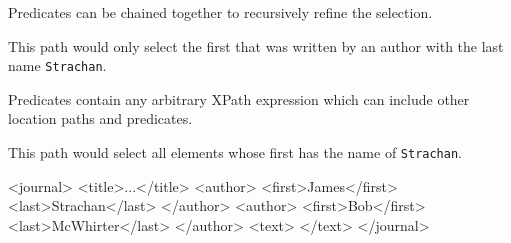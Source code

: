 \documentclass[20pt,landscape,headrule,footrule]{foils}
\begin{document}

Predicates can be chained together to recursively refine the
selection.


This path would only select the first  that was
written by an author with the last name \texttt{Strachan}.



Predicates contain any arbitrary XPath expression which can
include other location paths and predicates.


This path would select all  elements whose first
 has the  name of \texttt{Strachan}.




\begin{codelisting}
\tiny
<journal>
        <title>...</title>
        <author>
          <first>James</first>
          <last>Strachan</last>
        </author>
        <author>
          <first>Bob</first>
          <last>McWhirter</last>
        </author>
        <text>
        </text>
</journal>
\end{codelisting}



\end{document}
